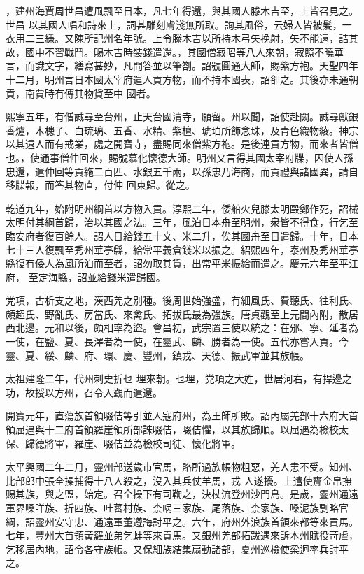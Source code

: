 \begin{pinyinscope}
 ，建州海賈周世昌遭風飄至日本，凡七年得還，與其國人滕木吉至，上皆召見之。世昌
 以其國人唱和詩來上，詞甚雕刻膚淺無所取。詢其風俗，云婦人皆被髪，一衣用二三縑。又陳所記州名年號。上令滕木吉以所持木弓矢挽射，矢不能遠，詰其故，國中不習戰鬥。賜木吉時裝錢遣還。，其國僧寂昭等八人來朝，寂照不曉華言，而識文字，繕寫甚妙，凡問答並以筆劄。詔號圓通大師，賜紫方袍。天聖四年十二月，明州言日本國太宰府遣人貢方物，而不持本國表，詔卻之。其後亦未通朝貢，南賈時有傳其物貨至中
 國者。



 熙寧五年，有僧誠尋至台州，止天台國清寺，願留。州以聞，詔使赴闕。誠尋獻銀香爐，木槵子、白琉璃、五香、水精、紫檀、琥珀所飾念珠，及青色織物綾。神宗以其遠人而有戒業，處之開寶寺，盡賜同來僧紫方袍。是後連貢方物，而來者皆僧也。，使通事僧仲回來，賜號慕化懷德大師。明州又言得其國太宰府牒，因使人孫忠還，遣仲回等貢絁二百匹、水銀五千兩，以孫忠乃海商，而貢禮與諸國異，請自移牒報，而答其物直，付仲
 回東歸。從之。



 乾道九年，始附明州綱首以方物入貢。淳熙二年，倭船火兒滕太明毆鄭作死，詔械太明付其綱首歸，治以其國之法。三年，風泊日本舟至明州，衆皆不得食，行乞至臨安府者復百餘人。詔人日給錢五十文、米二升，俟其國舟至日遣歸。十年，日本七十三人復飄至秀州華亭縣，給常平義倉錢米以振之。紹熙四年，泰州及秀州華亭縣復有倭人為風所泊而至者，詔勿取其貨，出常平米振給而遣之。慶元六年至平江府，
 至定海縣，詔並給錢米遣歸國。



 党項，古析支之地，漢西羌之別種。後周世始強盛，有細風氏、費聽氏、往利氏、頗超氏、野亂氏、房當氏、來禽氏、拓拔氏最為強族。唐貞觀至上元間內附，散居西北邊。元和以後，頗相率為盜。會昌初，武宗置三使以統之：在邠、寧、延者為一使，在鹽、夏、長澤者為一使，在靈武、麟、勝者為一使。五代亦嘗入貢。今靈、夏、綏、麟、府、環、慶、豐州，鎮戎、天德、振武軍並其族帳。



 太祖建隆二年，代州刺史折乜
 埋來朝。乜埋，党項之大姓，世居河右，有捍邊之功，故授以方州，召令入覲而遣還。



 開寶元年，直蕩族首領啜佶等引並人寇府州，為王師所敗。詔內屬羌部十六府大首領屈遇與十二府首領羅崖領所部誅啜佶，啜佶懼，以其族歸順。以屈遇為檢校太保、歸德將軍，羅崖、啜佶並為檢校司徒、懷化將軍。



 太平興國二年二月，靈州部送歲市官馬，賂所過族帳物粗惡，羌人恚不受。知州、比部郎中張全操捕得十八人殺之，沒入其兵仗羊馬，戎
 人遂擾。上遣使齎金帛撫賜其族，與之盟，始定。召全操下有司鞫之，決杖流登州沙門島。是歲，靈州通遠軍界嗓咩族、折四族、吐蕃村族、柰㖞三家族、尾落族、柰家族、嗓泥族剽略官綱，詔靈州安守忠、通遠軍董遵誨討平之。六年，府州外浪族首領來都等來貢馬。七年，豐州大首領黃羅並弟乞蚌等來貢馬。又銀州羌部拓跋遇來訴本州賦役苛虐，乞移居內地，詔令各守族帳。又保細族結集扇動諸部，夏州巡檢使梁迥率兵討平之。




\end{pinyinscope}
